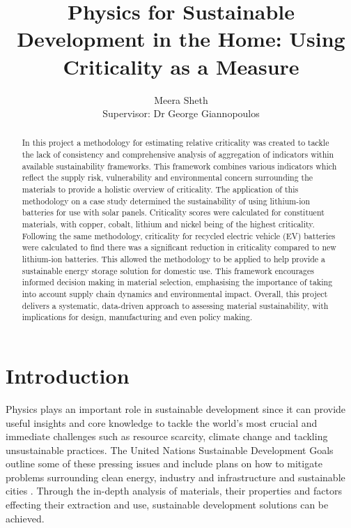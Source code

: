 \documentclass{article}
\title{Physics for Sustainable Development in the Home: Using Criticality as a Measure}
\author{Meera Sheth \\ Supervisor: Dr George Giannopoulos}
\begin{document}
\maketitle




\begin{abstract}

In this project a methodology for estimating relative criticality was created to tackle the lack of consistency and comprehensive analysis of aggregation of indicators within available sustainability frameworks. This framework combines various indicators which reflect the supply risk, vulnerability and environmental concern surrounding the materials to provide a holistic overview of criticality. The application of this methodology on a case study determined the sustainability of using lithium-ion batteries for use with solar panels. Criticality scores were calculated for constituent materials, with copper, cobalt, lithium and nickel being of the highest criticality. Following the same methodology, criticality for recycled electric vehicle (EV) batteries were calculated to find there was a significant reduction in criticality compared to new lithium-ion batteries. This allowed the methodology to be applied to help provide a sustainable energy storage solution for domestic use. This framework encourages informed decision making in material selection, emphasising the importance of taking into account supply chain dynamics and environmental impact. Overall, this project delivers a systematic, data-driven approach to assessing material sustainability, with implications for design, manufacturing and even policy making. 

\end{abstract}

\newpage
\tableofcontents

\newpage

\section{Introduction}
Physics plays an important role in sustainable development since it can provide useful insights and core knowledge to tackle the world's most crucial and immediate challenges such as resource scarcity, climate change and tackling unsustainable practices. The United Nations Sustainable Development Goals outline some of these pressing issues and include plans on how to mitigate problems surrounding clean energy, industry and infrastructure and sustainable cities \cite{UNSDG}. Through the in-depth analysis of materials, their properties and factors effecting their extraction and use, sustainable development solutions can be achieved. 
\end{document}
